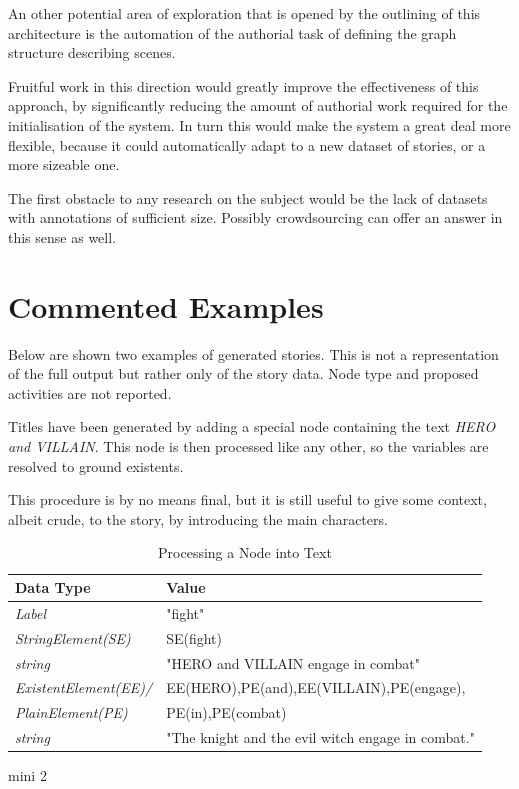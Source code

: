 \documentclass[12pt,a4paper,oneside]{report}
\begin{document}
\bigskip

An other potential area of exploration that is opened by the outlining of this architecture is the automation of the authorial task of defining the graph structure describing scenes.

Fruitful work in this direction would greatly improve the effectiveness of this approach, by significantly reducing the amount of authorial work required for the initialisation of the system. In turn this would make the system a great deal more flexible, because it could automatically adapt to a new dataset of stories, or a more sizeable one.

The first obstacle to any research on the subject would be the lack of datasets with annotations of sufficient size. Possibly crowdsourcing can offer an answer in this sense as well.

\appendix
\chapter{Commented Examples}
Below are shown two examples of generated stories. This is not a representation of the full output but rather only of the story data. Node type and proposed activities are not reported.

Titles have been generated by adding a special node containing the text \textit{HERO and VILLAIN}. This node is then processed like any other, so the variables are resolved to ground existents.

This procedure is by no means final, but it is still useful to give some context, albeit crude, to the story, by introducing the main characters.


\begin{minipage}[t]{0.5\textwidth}
	\begin{table}[H]
		\caption{Processing a Node into Text}
		\label{tab:example1}
		\bigskip
		\begin{tabular}{| l | l |}
			\hline
			Data Type & Value \\
			\hline
			\textit{Label} & "fight" \\
			\hline
			\textit{StringElement(SE)} & SE(fight) \\
			\hline
			\textit{string} & "HERO and VILLAIN engage in combat" \\
			\hline
			\textit{ExistentElement(EE)/} & EE(HERO),PE(and),EE(VILLAIN),PE(engage),\\
			\textit{PlainElement(PE)} & PE(in),PE(combat) \\
			\hline
			\textit{string} & "The knight and the evil witch engage in combat." \\
			\hline
			
		\end{tabular}
	\end{table}
\end{minipage} 
\begin{minipage}[t]{0.5\textwidth}
	mini 2
\end{minipage} 


\printbibliography
\end{document}
